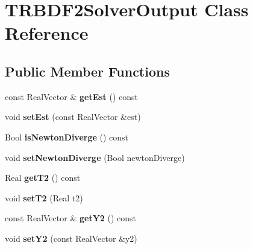 \hypertarget{classTRBDF2SolverOutput}{
\section{TRBDF2SolverOutput Class Reference}
\label{classTRBDF2SolverOutput}
}
\subsection*{Public Member Functions}
\begin{DoxyCompactItemize}
\item 
\hypertarget{classTRBDF2SolverOutput_ada9dea9ffe820a17b734a87461b91d4d}{
const RealVector \& {\bfseries getEst} () const }
\label{classTRBDF2SolverOutput_ada9dea9ffe820a17b734a87461b91d4d}

\item 
\hypertarget{classTRBDF2SolverOutput_af2f93169a340a6ab4a8a99b8d71c8a6c}{
void {\bfseries setEst} (const RealVector \&est)}
\label{classTRBDF2SolverOutput_af2f93169a340a6ab4a8a99b8d71c8a6c}

\item 
\hypertarget{classTRBDF2SolverOutput_a665a9fed4e9a09040f241a9f6f4a0e8d}{
Bool {\bfseries isNewtonDiverge} () const }
\label{classTRBDF2SolverOutput_a665a9fed4e9a09040f241a9f6f4a0e8d}

\item 
\hypertarget{classTRBDF2SolverOutput_a79f99dd83f2a1b46a802524efb07bea6}{
void {\bfseries setNewtonDiverge} (Bool newtonDiverge)}
\label{classTRBDF2SolverOutput_a79f99dd83f2a1b46a802524efb07bea6}

\item 
\hypertarget{classTRBDF2SolverOutput_a69b37f83acdcd8428b9ca8da2371ca9e}{
Real {\bfseries getT2} () const }
\label{classTRBDF2SolverOutput_a69b37f83acdcd8428b9ca8da2371ca9e}

\item 
\hypertarget{classTRBDF2SolverOutput_aa1786344740daff82d03595d328fa65a}{
void {\bfseries setT2} (Real t2)}
\label{classTRBDF2SolverOutput_aa1786344740daff82d03595d328fa65a}

\item 
\hypertarget{classTRBDF2SolverOutput_ac337515f4fa142662c1c1b05c7e9f60b}{
const RealVector \& {\bfseries getY2} () const }
\label{classTRBDF2SolverOutput_ac337515f4fa142662c1c1b05c7e9f60b}

\item 
\hypertarget{classTRBDF2SolverOutput_a67f38e014fe4d677cba7091e4e440d49}{
void {\bfseries setY2} (const RealVector \&y2)}
\label{classTRBDF2SolverOutput_a67f38e014fe4d677cba7091e4e440d49}


\end{DoxyCompactItemize}
